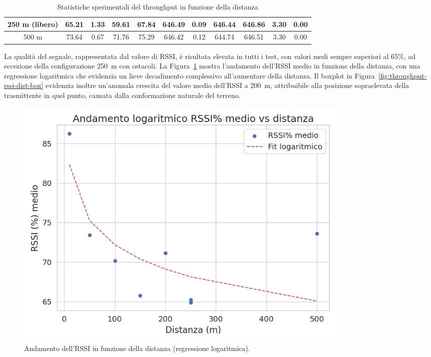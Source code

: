 \documentclass[12pt,a4paper,twoside]{book}
\begin{document}
\begin{table}[H]
{\begin{tabular}{|c|cccc|cccc|cc|}
            250 m (libero)    & 65.21                                   & 1.33                                              & 59.61                               & 67.84        & 646.49 & 0.09  & 646.44 & 646.86 & 3.30 & 0.00 \\ \hline
            500 m             & 73.64                                   & 0.67                                              & 71.76                               & 75.29        & 646.42 & 0.12  & 644.74 & 646.51 & 3.30 & 0.00 \\ \hline
        \end{tabular}
    }
    \caption{Statistiche sperimentali del throughput in funzione della distanza}
    \label{tab:T1-throughput_stats}
\end{table}

La qualità del segnale, rappresentata dal valore di \ac{RSSI}, è risultata elevata
in tutti i test, con valori medi sempre superiori al 65\%, ad eccezione della
configurazione 250~m con ostacoli. La Figura~\ref{fig:throughput-rssi-dist-regression}
mostra l’andamento dell’RSSI medio in funzione della distanza, con una regressione
logaritmica che evidenzia un lieve decadimento complessivo all’aumentare della distanza.
Il boxplot in Figura~\ref{fig:throughput-rssi-dist-box} evidenzia inoltre un’anomala
crescita del valore medio dell’RSSI a 200~m, attribuibile alla posizione sopraelevata
della trasmittente in quel punto, causata dalla conformazione naturale del terreno.

\begin{figure}[H]
    \centering
    \includegraphics[width=0.8\textwidth]{img/tests/T1/T1-rssi_dist_regression.png}
    \caption{Andamento dell'RSSI in funzione della distanza (regressione logaritmica).}
    \label{fig:throughput-rssi-dist-regression}
\end{figure}
\end{document}
